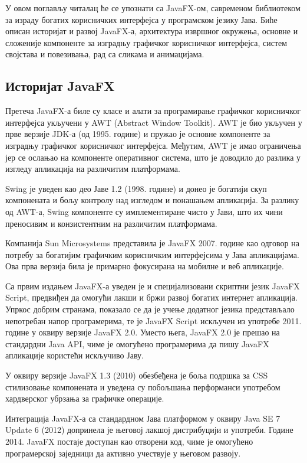 У овом поглављу читалац ће се упознати са JavaFX-ом, савременом библиотеком за израду богатих корисничких интерфејса у програмском језику Јава. Биће описан историјат и развој JavaFX-а, архитектура извршног окружења, основне и сложеније компоненте за изградњу графичког корисничког интерфејса, систем својстава и повезивања, рад са сликама и анимацијама.


\subsection{Историјат JavaFX}

Претеча JavaFX-а биле су класе и алати за програмирање графичког корисничког интерфејса укључени у AWT (Abstract Window Toolkit). AWT је био укључен у прве верзије JDK-а (од 1995. године) и пружао је основне компоненте за изградњу графичког корисничког интерфејса. Међутим, AWT је имао ограничења јер се ослањао на компоненте оперативног система, што је доводило до разлика у изгледу апликација на различитим платформама.

Swing је уведен као део Јаве 1.2 (1998. године) и донео је богатији скуп компонената и бољу контролу над изгледом и понашањем апликација. За разлику од AWT-а, Swing компоненте су имплементиране чисто у Јави, што их чини преносивим и конзистентним на различитим платформама.

Компанија Sun Microsystems представила је JavaFX 2007. године као одговор на потребу за богатијим графичким корисничким интерфејсима у Јава апликацијама. Ова прва верзија била је примарно фокусирана на мобилне и веб апликације.

Са првим издањем JavaFX-а уведен је и специјализовани скриптни језик JavaFX Script, предвиђен да омогући лакши и бржи развој богатих интернет апликација. Упркос добрим странама, показало се да је учење додатног језика представљало непотребан напор програмерима, те је JavaFX Script искључен из употребе 2011. године у оквиру верзије JavaFX 2.0. Уместо њега, JavaFX 2.0 је прешао на стандардни Java API, чиме је омогућено програмерима да пишу JavaFX апликације користећи искључиво Јаву.

У оквиру верзије JavaFX 1.3 (2010) обезбеђена је боља подршка за CSS стилизовање компонената и уведена су побољшања перформанси употребом хардверског убрзања за графичке операције.

Интеграција JavaFX-а са стандардном Јава платформом у оквиру Java SE 7 Update 6 (2012) допринела је његовој лакшој дистрибуцији и употреби. Године 2014. JavaFX постаје доступан као отворени код, чиме је омогућено програмерској заједници да активно учествује у његовом развоју.

